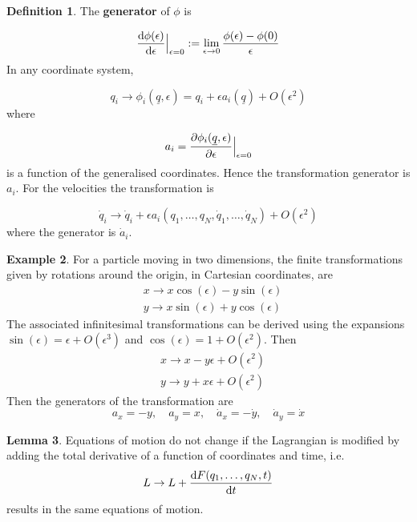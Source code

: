 \documentclass[12pt,a4paper]{article}
\theoremstyle{definition}
\newtheorem{definition}{Definition}[subsection]
\newtheorem{lemma}[definition]{Lemma}
\newtheorem{example}[definition]{Example}
\begin{document}
\begin{definition}
	The \textbf{generator} of $\phi$ is

	\[ \diff{\phi(\epsilon)}{\epsilon} \Big|_{\epsilon = 0} := \lim_{\epsilon \rightarrow 0} \frac{\phi(\epsilon) - \phi(0)}{\epsilon} \]
	In any coordinate system,

	\[ q_i \rightarrow \phi_i(\underline{q}, \epsilon) = q_i + \epsilon a_i(\underline{q}) + O(\epsilon^2) \]
	where

	\[ a_i = \diffp{\phi_i(\underline{q}, \epsilon)}{\epsilon} \Big|_{\epsilon = 0} \]
	is a function of the generalised coordinates. Hence the transformation generator is $a_i$. For the velocities the transformation is

	\[ \dot{q}_i \rightarrow \dot{q}_i + \epsilon a_i(q_1, \dots, q_N, \dot{q}_1, \dots, \dot{q}_N) + O(\epsilon^2) \]
	where the generator is $\dot{a}_i$.
\end{definition}

\begin{example}
	For a particle moving in two dimensions, the finite transformations given by rotations around the origin, in Cartesian coordinates, are
	\[
		\begin{aligned}
			& x \rightarrow x \cos(\epsilon) - y \sin(\epsilon) \\
			& y \rightarrow x \sin(\epsilon) + y \cos(\epsilon)
		\end{aligned}
	\]
	The associated infinitesimal transformations can be derived using the expansions $\sin(\epsilon) = \epsilon + O(\epsilon^3)$ and $\cos(\epsilon) = 1 + O(\epsilon^2)$. Then
	\[
		\begin{aligned}
			& x \rightarrow x - y \epsilon + O(\epsilon^2) \\
			& y \rightarrow y + x \epsilon + O(\epsilon^2)
		\end{aligned}
	\]
	Then the generators of the transformation are
	\[
		a_x = -y, \quad a_y = x, \quad \dot{a}_x = -\dot{y}, \quad \dot{a}_y = \dot{x}
	\]
\end{example}

\begin{lemma}
	Equations of motion do not change if the Lagrangian is modified by adding the total derivative of a function of coordinates and time, i.e.
	\[
		L \rightarrow L + \diff{F(q_1, \dots, q_N, t)}{t}
	\]
	results in the same equations of motion.
\end{lemma}
\end{document}
